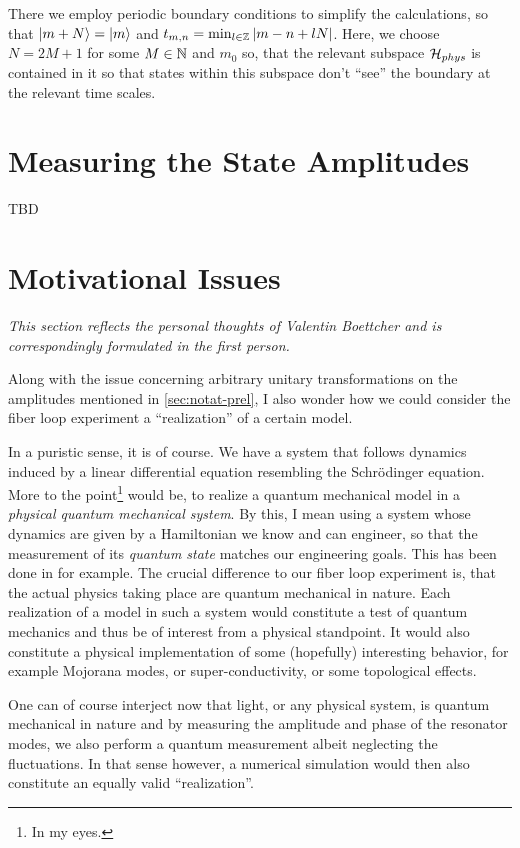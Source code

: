\documentclass[fontsize=10pt,paper=a4,open=any,
twoside=no,toc=listof,toc=bibliography,headings=optiontohead,
captions=nooneline,captions=tableabove,english,DIV=15,numbers=noenddot,final,parskip=half-,
headinclude=true,footinclude=false,BCOR=0mm]{scrartcl}
\begin{document}
There we employ periodic boundary conditions to simplify the
calculations, so that \(\ket{m+N} = \ket{m}\) and
\(t_{m,n}=\min_{l\in \mathbb{Z}}{\abs{m-n + l N}}\). Here, we choose
\(N=2M +1\) for some \(M\in\mathbb{N}\) and \(m_{0}\) so, that the relevant
subspace \(\mathcal{H}_{phys}\) is contained in it so that states within
this subspace don't ``see'' the boundary at the relevant time scales.


\section{Measuring the State Amplitudes}
\label{sec:meas-state-ampl}

TBD

\section{Motivational Issues}
\label{sec:motiv-probl}

\emph{This section reflects the personal thoughts of Valentin Boettcher and
is correspondingly formulated in the first person.}

Along with the issue concerning arbitrary unitary transformations on
the amplitudes mentioned in \cref{sec:notat-prel}, I also wonder how
we could consider the fiber loop experiment a ``realization'' of a
certain model.

In a puristic sense, it is of course. We have a system that follows
dynamics induced by a linear differential equation resembling the
Schr\"odinger equation. More to the point\footnote{In my eyes.} would
be, to realize a quantum mechanical model in a \emph{physical quantum
  mechanical system}. By this, I mean using a system whose dynamics
are given by a Hamiltonian we know and can engineer, so that the
measurement of its \emph{quantum state} matches our engineering
goals. This has been done in \cite{Roushan2014} for example. The
crucial difference to our fiber loop experiment is, that the actual
physics taking place are quantum mechanical in nature. Each
realization of a model in such a system would constitute a test of
quantum mechanics and thus be of interest from a physical
standpoint. It would also constitute a physical implementation of some
(hopefully) interesting behavior, for example Mojorana modes, or
super-conductivity, or some topological effects.

One can of course interject now that light, or any physical system, is
quantum mechanical in nature and by measuring the amplitude and phase
of the resonator modes, we also perform a quantum measurement albeit
neglecting the fluctuations. In that sense however, a numerical simulation
would then also constitute an equally valid ``realization''.
\end{document}
